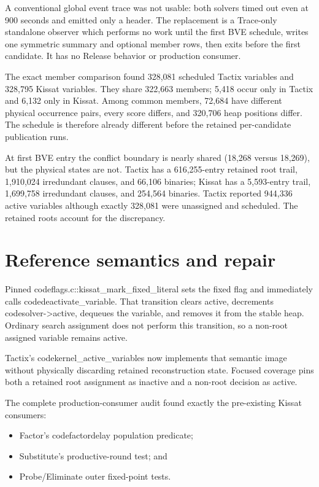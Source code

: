 \documentclass[11pt]{article}
\begin{document}
A conventional global event trace was not usable: both solvers timed out even
at 900 seconds and emitted only a header.  The replacement is a Trace-only
standalone observer which performs no work until the first BVE schedule, writes
one symmetric summary and optional member rows, then exits before the first
candidate.  It has no Release behavior or production consumer.

The exact member comparison found 328,081 scheduled Tactix variables and
328,795 Kissat variables.  They share 322,663 members; 5,418 occur only in
Tactix and 6,132 only in Kissat.  Among common members, 72,684 have different
physical occurrence pairs, every score differs, and 320,706 heap positions
differ.  The schedule is therefore already different before the retained
per-candidate publication runs.

At first BVE entry the conflict boundary is nearly shared (18,268 versus
18,269), but the physical states are not.  Tactix has a 616,255-entry retained
root trail, 1,910,024 irredundant clauses, and 66,106 binaries; Kissat has a
5,593-entry trail, 1,699,758 irredundant clauses, and 254,564 binaries.  Tactix
reported 944,336 active variables although exactly 328,081 were unassigned and
scheduled.  The retained roots account for the discrepancy.

\section{Reference semantics and repair}

Pinned code{flags.c::kissat\_mark\_fixed\_literal} sets the fixed flag and
immediately calls code{deactivate\_variable}.  That transition clears active,
decrements code{solver->active}, dequeues the variable, and removes it from
the stable heap.  Ordinary search assignment does not perform this transition,
so a non-root assigned variable remains active.

Tactix's code{kernel\_active\_variables} now implements that semantic image
without physically discarding retained reconstruction state.  Focused coverage
pins both a retained root assignment as inactive and a non-root decision as
active.

The complete production-consumer audit found exactly the pre-existing Kissat
consumers:

\begin{itemize}
\item Factor's code{factordelay} population predicate;
\item Substitute's productive-round test; and
\item Probe/Eliminate outer fixed-point tests.
\end{itemize}
\end{document}
